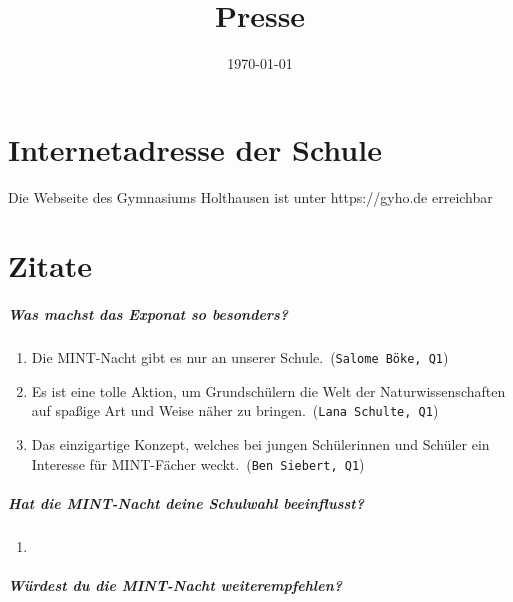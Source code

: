 \documentclass[12pt,a4paper]{report}
\begin{document}
	\bsremovechaptertitle
	\title{Presse}
	\date{\today}
	\maketitle
	\noindent
	\chapter{Internetadresse der Schule}
	Die Webseite des Gymnasiums Holthausen ist unter \color{blue}https://gyho.de \color{black} erreichbar 
	\chapter{Zitate}
	\paragraph{Was machst das Exponat so besonders?} \mbox{}
	\begin{enumerate}
		\item \dq Die MINT-Nacht gibt es nur an unserer Schule.\dq\ (\texttt{Salome Böke, Q1})
		\item \dq Es ist eine tolle Aktion, um Grundschülern die Welt der Naturwissenschaften auf spaßige Art und Weise näher zu bringen.\dq\ (\texttt{Lana Schulte, Q1})
		\item \dq Das einzigartige Konzept, welches bei jungen Schülerinnen und Schüler ein Interesse für MINT-Fächer weckt.\dq\ (\texttt{Ben Siebert, Q1})
	\end{enumerate}
	\paragraph{Hat die MINT-Nacht deine Schulwahl beeinflusst?}
	\begin{enumerate}
		\item 
	\end{enumerate}
	\paragraph{Würdest du die MINT-Nacht weiterempfehlen?}
	
\end{document}

